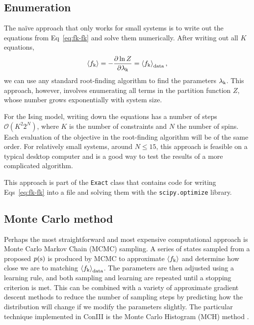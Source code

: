 \documentclass[aps,prl,twocolumn,nofootinbib]{revtex4-1}
\begin{document}
\subsection{Enumeration}
The na\"{i}ve approach that only works for small systems is to write out the equations from Eq~\ref{eq:fk-fk} and solve them numerically. After writing out all $K$ equations,
\begin{equation}
	\left<f_{\rm k}\right> = -\frac{\partial \ln Z}{\partial \lambda_{\rm k}} = \left<f_{\rm k}\right>_{\rm data} \\,
\end{equation}
we can use any standard root-finding algorithm to find the parameters $\lambda_{\rm k}$.
This approach, however, involves enumerating all terms in the partition function $Z$, whose number grows exponentially with system size.

For the Ising model, writing down the equations has a number of steps $\mathcal{O}(K^2 2^{N})$, where $K$ is the number of constraints and $N$ the number of spins.  Each evaluation of the objective in the root-finding algorithm will be of the same order. For relatively small systems, around $N\leq15$, this approach is feasible on a typical desktop computer and is a good way to test the results of a more complicated algorithm.

This approach is part of the {\tt Exact} class that contains code for writing Eqs~\ref{eq:fk-fk} into a file and solving them with the {\tt scipy.optimize} library.


\subsection{Monte Carlo method}
Perhaps the most straightforward and most expensive computational approach is Monte Carlo Markov Chain (MCMC) sampling.  A series of states sampled from a proposed $p({\rm s})$ is produced by MCMC to approximate $\left<f_{\rm k}\right>$ and determine how close we are to matching $\left<f_{\rm k}\right>_{\rm data}$.  The parameters are then adjusted using a learning rule, and both sampling and learning are repeated until a stopping criterion is met.
This can be combined with a variety of approximate gradient descent methods to reduce the number of sampling steps by predicting how the distribution will change if we modify the parameters slightly.
The particular technique implemented in ConIII is the Monte Carlo Histogram (MCH) method \cite{Broderick:2007wq}.
\end{document}

